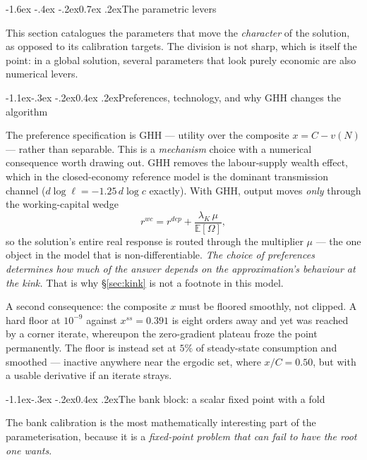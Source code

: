 \documentclass[10pt,a4paper]{article}
\makeatletter
\theoremstyle{definition}
\theoremstyle{plain}
\theoremstyle{remark}
\newcommand{\E}{\mathbb{E}}
\renewcommand\section{\@startsection{section}{1}{\z@}%
  {-1.6ex \@plus -.4ex \@minus -.2ex}{0.7ex \@plus.2ex}{\normalfont\large\bfseries}}
\renewcommand\subsection{\@startsection{subsection}{2}{\z@}%
  {-1.1ex\@plus -.3ex \@minus -.2ex}{0.4ex \@plus .2ex}{\normalfont\normalsize\bfseries}}
\makeatother
\begin{document}
\section{The parametric levers}

This section catalogues the parameters that move the \emph{character} of the solution, as
opposed to its calibration targets. The division is not sharp, which is itself the point: in a
global solution, several parameters that look purely economic are also numerical levers.

\subsection{Preferences, technology, and why GHH changes the algorithm}

The preference specification is GHH --- utility over the composite $x = C - v(N)$ --- rather
than separable. This is a \emph{mechanism} choice with a numerical consequence worth drawing
out. GHH removes the labour-supply wealth effect, which in the closed-economy reference model
is the dominant transmission channel ($d\log\ell = -1.25\,d\log c$ exactly). With GHH, output
moves \emph{only} through the working-capital wedge
\begin{equation}
  r^{wc} = r^{dep} + \frac{\lambda_K\,\mu}{\E[\Omega]},
  \label{eq:wedge}
\end{equation}
so the solution's entire real response is routed through the multiplier $\mu$ --- the one
object in the model that is non-differentiable. \emph{The choice of preferences determines how
much of the answer depends on the approximation's behaviour at the kink.} That is why
\S\ref{sec:kink} is not a footnote in this model.

A second consequence: the composite $x$ must be floored smoothly, not clipped. A hard floor at
$10^{-9}$ against $x^{ss}=0.391$ is eight orders away and yet was reached by a corner iterate,
whereupon the zero-gradient plateau froze the point permanently. The floor is instead set at
$5\%$ of steady-state consumption and smoothed --- inactive anywhere near the ergodic set,
where $x/C = 0.50$, but with a usable derivative if an iterate strays.

\subsection{The bank block: a scalar fixed point with a fold}
\label{sec:fold}

The bank calibration is the most mathematically interesting part of the parameterisation,
because it is a \emph{fixed-point problem that can fail to have the root one wants}.
\end{document}
